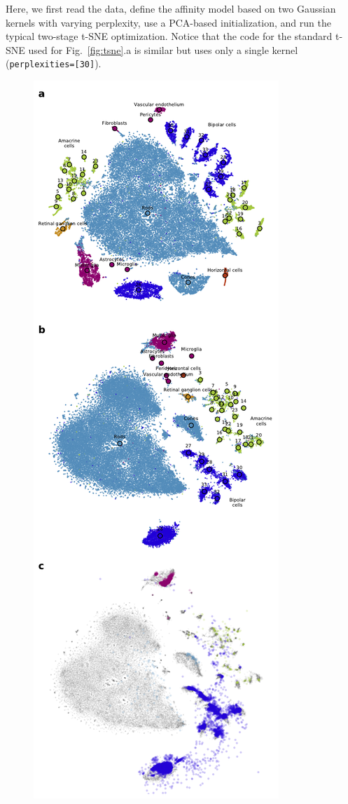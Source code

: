 \documentclass{bioinfo}
\begin{document}
\noindent Here, we first read the data, define the affinity model based on two
Gaussian kernels with varying perplexity, use a PCA-based initialization, and run
the typical two-stage t-SNE optimization. Notice that the code for the standard
t-SNE used for Fig.~\ref{fig:tsne}.a is similar but uses only a single kernel
({\tt perplexities=[30]}).

\begin{figure}[htbp]
\centerline{\includegraphics[width=0.7\linewidth]{policar-fig-1}}

\end{figure}
\end{document}
